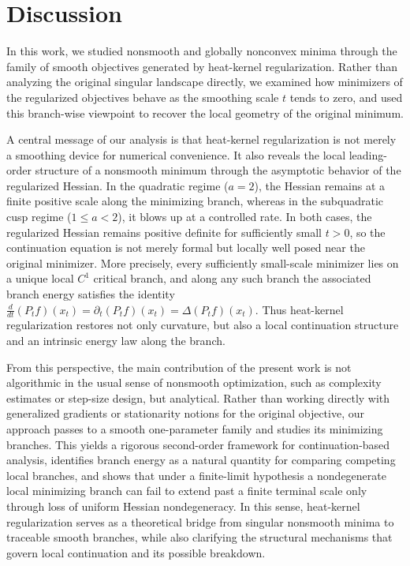 \documentclass{article}
\begin{document}
\section{Discussion}
In this work, we studied nonsmooth and globally nonconvex minima through the family of smooth objectives generated by heat-kernel regularization. Rather than analyzing the original singular landscape directly, we examined how minimizers of the regularized objectives behave as the smoothing scale $t$ tends to zero, and used this branch-wise viewpoint to recover the local geometry of the original minimum.

A central message of our analysis is that heat-kernel regularization is not merely a smoothing device for numerical convenience. It also reveals the local leading-order structure of a nonsmooth minimum through the asymptotic behavior of the regularized Hessian. In the quadratic regime ($a=2$), the Hessian remains at a finite positive scale along the minimizing branch, whereas in the subquadratic cusp regime ($1\le a<2$), it blows up at a controlled rate. In both cases, the regularized Hessian remains positive definite for sufficiently small $t>0$, so the continuation equation is not merely formal but locally well posed near the original minimizer. More precisely, every sufficiently small-scale minimizer lies on a unique local $C^1$ critical branch, and along any such branch the associated branch energy satisfies the identity
$\frac{d}{dt}(P_t f)(x_t)=\partial_t(P_t f)(x_t)=\Delta(P_t f)(x_t)$. Thus heat-kernel regularization restores not only curvature, but also a local continuation structure and an intrinsic energy law along the branch.

From this perspective, the main contribution of the present work is not algorithmic in the usual sense of nonsmooth optimization, such as complexity estimates or step-size design, but analytical. Rather than working directly with generalized gradients or stationarity notions for the original objective, our approach passes to a smooth one-parameter family and studies its minimizing branches. This yields a rigorous second-order framework for continuation-based analysis, identifies branch energy as a natural quantity for comparing competing local branches, and shows that under a finite-limit hypothesis a nondegenerate local minimizing branch can fail to extend past a finite terminal scale only through loss of uniform Hessian nondegeneracy. In this sense, heat-kernel regularization serves as a theoretical bridge from singular nonsmooth minima to traceable smooth branches, while also clarifying the structural mechanisms that govern local continuation and its possible breakdown.
\end{document}

